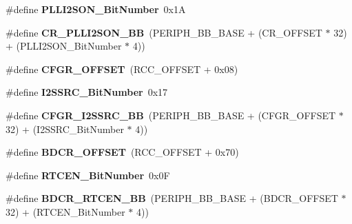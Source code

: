 \begin{DoxyCompactItemize}
\item 
\hypertarget{group___r_c_c_gabae59c3e4200523e3aa5b6e10aee8c46}{\#define {\bfseries P\-L\-L\-I2\-S\-O\-N\-\_\-\-Bit\-Number}~0x1\-A}\label{group___r_c_c_gabae59c3e4200523e3aa5b6e10aee8c46}

\item 
\hypertarget{group___r_c_c_ga0c0fb27aba4eb660f7590252596bdfc5}{\#define {\bfseries C\-R\-\_\-\-P\-L\-L\-I2\-S\-O\-N\-\_\-\-B\-B}~(P\-E\-R\-I\-P\-H\-\_\-\-B\-B\-\_\-\-B\-A\-S\-E + (C\-R\-\_\-\-O\-F\-F\-S\-E\-T $\ast$ 32) + (P\-L\-L\-I2\-S\-O\-N\-\_\-\-Bit\-Number $\ast$ 4))}\label{group___r_c_c_ga0c0fb27aba4eb660f7590252596bdfc5}

\item 
\hypertarget{group___r_c_c_ga8682298330c3b9bae1992e4f1a0af985}{\#define {\bfseries C\-F\-G\-R\-\_\-\-O\-F\-F\-S\-E\-T}~(R\-C\-C\-\_\-\-O\-F\-F\-S\-E\-T + 0x08)}\label{group___r_c_c_ga8682298330c3b9bae1992e4f1a0af985}

\item 
\hypertarget{group___r_c_c_ga9561d436b438d8f513b754f1934c3e30}{\#define {\bfseries I2\-S\-S\-R\-C\-\_\-\-Bit\-Number}~0x17}\label{group___r_c_c_ga9561d436b438d8f513b754f1934c3e30}

\item 
\hypertarget{group___r_c_c_ga9076f5ddbb262fd45584702f5d280c9e}{\#define {\bfseries C\-F\-G\-R\-\_\-\-I2\-S\-S\-R\-C\-\_\-\-B\-B}~(P\-E\-R\-I\-P\-H\-\_\-\-B\-B\-\_\-\-B\-A\-S\-E + (C\-F\-G\-R\-\_\-\-O\-F\-F\-S\-E\-T $\ast$ 32) + (I2\-S\-S\-R\-C\-\_\-\-Bit\-Number $\ast$ 4))}\label{group___r_c_c_ga9076f5ddbb262fd45584702f5d280c9e}

\item 
\hypertarget{group___r_c_c_ga5f8a0c3cb5f5c835bf7eef09515138ad}{\#define {\bfseries B\-D\-C\-R\-\_\-\-O\-F\-F\-S\-E\-T}~(R\-C\-C\-\_\-\-O\-F\-F\-S\-E\-T + 0x70)}\label{group___r_c_c_ga5f8a0c3cb5f5c835bf7eef09515138ad}

\item 
\hypertarget{group___r_c_c_ga9302c551752124766afc4cee65436405}{\#define {\bfseries R\-T\-C\-E\-N\-\_\-\-Bit\-Number}~0x0\-F}\label{group___r_c_c_ga9302c551752124766afc4cee65436405}

\item 
\hypertarget{group___r_c_c_gaf70aaf70b0752ccb3a60307b2fb46038}{\#define {\bfseries B\-D\-C\-R\-\_\-\-R\-T\-C\-E\-N\-\_\-\-B\-B}~(P\-E\-R\-I\-P\-H\-\_\-\-B\-B\-\_\-\-B\-A\-S\-E + (B\-D\-C\-R\-\_\-\-O\-F\-F\-S\-E\-T $\ast$ 32) + (R\-T\-C\-E\-N\-\_\-\-Bit\-Number $\ast$ 4))}\label{group___r_c_c_gaf70aaf70b0752ccb3a60307b2fb46038}


\end{DoxyCompactItemize}
